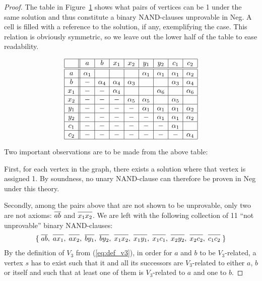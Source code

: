 \begin{proof}
The table in Figure~\ref{fig:v3_counter_table} shows what pairs of vertices can be 1 under the same solution and thus constitute a binary NAND-clauses unprovable in Neg.
A cell is filled with a reference to the solution, if any, exemplifying the case.
This relation is obviously symmetric, so we leave out the lower half of the table to ease readability.
\begin{figure}[!h]
  \centering
  \[\begin{array}{|c||c|c|c|c|c|c|c|c|}
    \hline
    & a & b & x_1 & x_2 & y_1 & y_2 & c_1 & c_2 \\ \hline\hline
    a & \alpha_1 & & & & \alpha_1 & \alpha_1 & \alpha_1 & \alpha_2 \\ \hline
    b &-& \alpha_4 & \alpha_4 & \alpha_3 & & & \alpha_3 & \alpha_4 \\ \hline
    x_1 &-&-& \alpha_4 & & & \alpha_6 & & \alpha_6 \\ \hline
    x_2 &-&-&-& \alpha_5 & \alpha_5 & & \alpha_5 & \\ \hline
    y_1 &-&-&-&-& \alpha_1 & \alpha_1 & \alpha_1 & \alpha_2 \\ \hline
    y_2 &-&-&-&-&-& \alpha_1 & \alpha_1 & \alpha_2 \\ \hline
    c_1 &-&-&-&-&-&-& \alpha_1 & \\ \hline
    c_2 &-&-&-&-&-&-&-& \alpha_4 \\ \hline
  \end{array}\]
  \caption{}
  \label{fig:v3_counter_table}
\end{figure}
\FloatBarrier
Two important observations are to be made from the above table:

First, for each vertex in the graph, there exists a solution where that vertex is assigned 1.
By soundness, no unary NAND-clause can therefore be proven in Neg under this theory.

Secondly, among the pairs above that are not shown to be unprovable, only two are not axioms: $\ol{ab}$ and $\ol{x_1x_2}$.
We are left with the following collection of 11 ``not unprovable'' binary NAND-clauses:
\begin{align}
  \{\; \ol{ab},\; \ol{ax_1},\; \ol{ax_2},\; \ol{by_1},\; \ol{by_2},\; \ol{x_1x_2},\; \ol{x_1y_1},\; \ol{x_1c_1},\; \ol{x_2y_2},\; \ol{x_2c_2},\; \ol{c_1c_2}\; \}
\end{align}
By the definition of $V_3$ from (\ref{eq:def_v3}), in order for $a$ and $b$ to be $V_3$-related, a vertex $s$ has to exist such that it and all its successors are $V_3$-related to either $a$, $b$ or itself and such that at least one of them is $V_3$-related to $a$ and one to $b$.


\end{proof}
